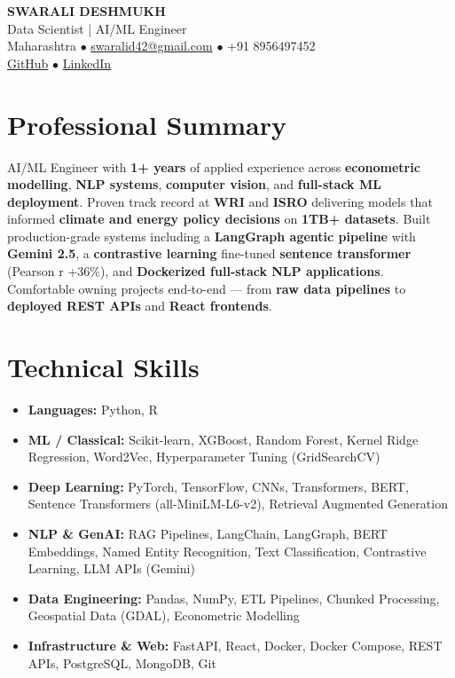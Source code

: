\documentclass[11pt,a4paper]{article}
\begin{document}
\begin{center}
    {\Huge\bfseries SWARALI DESHMUKH}\\[6pt]
    {\large Data Scientist | AI/ML Engineer}\\[8pt]
    Maharashtra \quad $\bullet$ \quad
    \href{mailto:swaralid42@gmail.com}{swaralid42@gmail.com} \quad $\bullet$ \quad
    +91 8956497452 \\[4pt]
    \href{https://github.com/PurpleHycinth}{GitHub} \quad $\bullet$ \quad
    \href{https://www.linkedin.com/in/swarali-deshmukh-a54597218/}{LinkedIn}
\end{center}
\vspace{10pt}

\section{Professional Summary}
AI/ML Engineer with \textbf{1+ years} of applied experience across \textbf{econometric modelling}, \textbf{NLP systems}, \textbf{computer vision}, and \textbf{full-stack ML deployment}. Proven track record at \textbf{WRI} and \textbf{ISRO} delivering models that informed \textbf{climate and energy policy decisions} on \textbf{1TB+ datasets}. Built production-grade systems including a \textbf{LangGraph agentic pipeline} with \textbf{Gemini 2.5}, a \textbf{contrastive learning} fine-tuned \textbf{sentence transformer} (Pearson r +36\%), and \textbf{Dockerized full-stack NLP applications}. Comfortable owning projects end-to-end --- from \textbf{raw data pipelines} to \textbf{deployed REST APIs} and \textbf{React frontends}.

\section{Technical Skills}
\begin{itemize}[leftmargin=*, label={}, itemsep=2pt, parsep=1pt]
    \item \textbf{Languages:} Python, R
    \item \textbf{ML / Classical:} Scikit-learn, XGBoost, Random Forest, Kernel Ridge Regression, Word2Vec, Hyperparameter Tuning (GridSearchCV)
    \item \textbf{Deep Learning:} PyTorch, TensorFlow, CNNs, Transformers, BERT, Sentence Transformers (all-MiniLM-L6-v2), Retrieval Augmented Generation
    \item \textbf{NLP \& GenAI:} RAG Pipelines, LangChain, LangGraph, BERT Embeddings, Named Entity Recognition, Text Classification, Contrastive Learning, LLM APIs (Gemini)
    \item \textbf{Data Engineering:} Pandas, NumPy, ETL Pipelines, Chunked Processing, Geospatial Data (GDAL), Econometric Modelling
    \item \textbf{Infrastructure \& Web:} FastAPI, React, Docker, Docker Compose, REST APIs, PostgreSQL, MongoDB, Git
\end{itemize}
\end{document}

